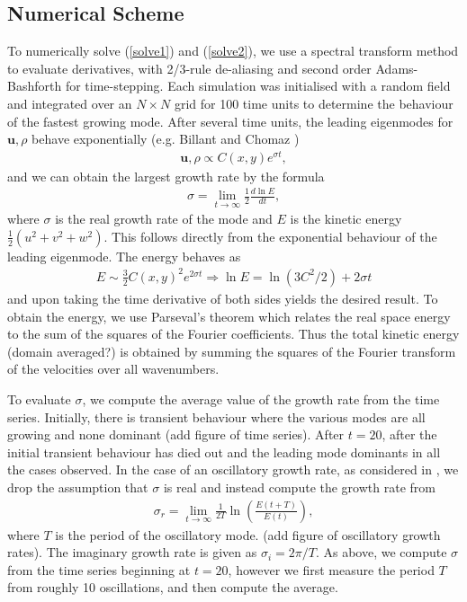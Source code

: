 \subsection{Numerical Scheme}

To numerically solve (\ref{solve1}) and (\ref{solve2}), we use a spectral transform method to evaluate derivatives, with 2/3-rule de-aliasing and second order Adams-Bashforth for time-stepping. Each simulation was initialised with a random field and integrated over an $N\times N$ grid for 100 time units to determine the behaviour of the fastest growing mode. After several time units, the leading eigenmodes for $\bm{u},\rho$ behave exponentially (e.g. Billant and Chomaz \cite{bc2000c})
\begin{align}
\bm{u},\rho \propto C(x,y)e^{\sigma t},
\end{align}
and we can obtain the largest growth rate by the formula
\begin{align}
\sigma = \lim_{t\rightarrow\infty}\frac{1}{2}\frac{d\ln E}{dt}\label{sigma1},
\end{align}
where $\sigma$ is the real growth rate of the mode and $E$ is the kinetic energy $\frac{1}{2}(u^{2}+v^{2}+w^{2})$. This follows directly from the exponential behaviour of the leading eigenmode. The energy behaves as
\begin{align}
E \sim \frac{3}{2}C(x,y)^{2}e^{2\sigma t} \Rightarrow \ln E = \ln(3C^{2}/2) + 2\sigma t
\end{align}
and upon taking the time derivative of both sides yields the desired result. To obtain the energy, we use Parseval's theorem which relates the real space energy to the sum of the squares of the Fourier coefficients. Thus the total kinetic energy (domain averaged?) is obtained by summing the squares of the Fourier transform of the velocities over all wavenumbers. 

To evaluate $\sigma$, we compute the average value of the growth rate from the time series. Initially, there is transient behaviour where the various modes are all growing and none dominant (add figure of time series). After $t=20$, after the initial transient behaviour has died out and the leading mode dominants in all the cases observed. In the case of an oscillatory growth rate, as considered in \cite{bc1999}, we drop the assumption that $\sigma$ is real and instead compute the growth rate from
\begin{align}
\sigma_{r} = \lim_{t\rightarrow \infty} \frac{1}{2T}\ln\left(\frac{E(t+T)}{E(t)}\right)\label{sigma2},
\end{align}
where $T$ is the period of the oscillatory mode. (add figure of oscillatory growth rates). The imaginary growth rate is given as $\sigma_{i}=2\pi/T$. As above, we compute $\sigma$ from the time series beginning at $t=20$, however we first measure the period $T$ from roughly 10 oscillations, and then compute the average.  

